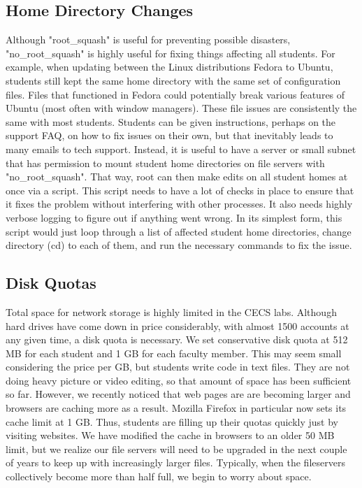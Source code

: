 \subsection{Home Directory Changes}
Although "root\_squash" is useful for preventing possible disasters, "no\_root\_squash" is highly useful for fixing things affecting all students.  For example, when updating between the Linux distributions Fedora to Ubuntu, students still kept the same home directory with the same set of configuration files.  Files that functioned in Fedora could potentially break various features of Ubuntu (most often with window managers).  These file issues are consistently the same with most students. Students can be given instructions, perhaps on the support FAQ, on how to fix issues on their own, but that inevitably leads to many emails to tech support.  Instead, it is useful to have a server or small subnet that has permission to mount student home directories on file servers with "no\_root\_squash".  That way, root can then make edits on all student homes at once via a script.  This script needs to have a lot of checks in place to ensure that it fixes the problem without interfering with other processes.  It also needs highly verbose logging to figure out if anything went wrong.  In its simplest form, this script would just loop through a list of affected student home directories, change directory (cd) to each of them, and run the necessary commands to fix the issue.  

\subsection{Disk Quotas}
Total space for network storage is highly limited in the CECS labs.  Although hard drives have come down in price considerably, with almost 1500 accounts at any given time, a disk quota is necessary.  We set conservative disk quota at 512 MB for each student and 1 GB for each faculty member.  This may seem small considering the price per GB, but students write code in text files.  They are not doing heavy picture or video editing, so that amount of space has been sufficient so far.  However, we recently noticed that web pages are are becoming larger and browsers are caching more as a result.  Mozilla Firefox in particular now sets its cache limit at 1 GB.  Thus, students are filling up their quotas quickly just by visiting websites.  We have modified the cache in browsers to an older 50 MB limit, but we realize our file servers will need to be upgraded in the next couple of years to keep up with increasingly larger files.  Typically, when the fileservers collectively become more than half full, we begin to worry about space.  

